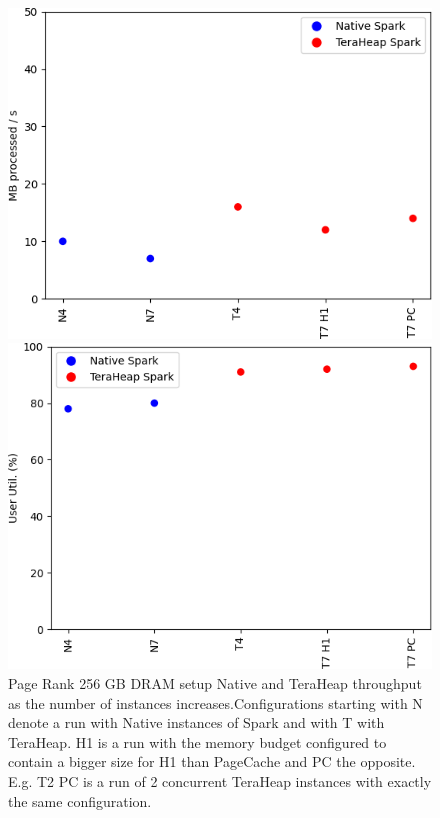 \begin{figure}[thbp]
	\iffalse
        \includegraphics[width=\linewidth]{./fig/PR_256_THR.png}
    \caption{Page Rank 256 GB DRAM setup Native and TeraHeap
    throughput as the number of instances increases.Configurations
    starting with N denote a run with Native instances of Spark and
    with T with TeraHeap. H1 is a run with the memory budget
    configured to contain a bigger size for H1 than PageCache and PC
    the opposite. E.g. T2 PC is a run of 2 concurrent TeraHeap
    instances with exactly the same configuration. }
                \label{fig:pr_256_thr}
        \includegraphics[width=\linewidth]{./fig/PR_256_USR.png}

\end{figure}
